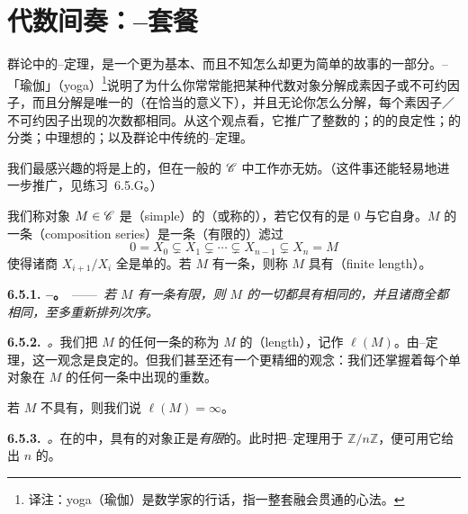 
\section{代数间奏：\trJordan--\trHolder{}套餐}

群论中的\trJordan--\trHolder{}定理，是一个更为基本、而且不知怎么却更为简单的故事的一部分。\trJordan--\trHolder{}「瑜伽」（yoga）\footnote{译注：yoga（瑜伽）是数学家的行话，指一整套融会贯通的心法。}说明了为什么你常常能把某种代数对象分解成素因子或不可约因子，而且分解是唯一的（在恰当的意义下），并且无论你怎么分解，每个素因子／不可约因子出现的次数都相同。从这个观点看，它推广了整数的\trFactorial；\trVectorSpace{}的\trDimension{}的良定性；\trFinitelyGenerated\trAbelianGroups{}的分类；\trDedekind\trIntegralDomain{}中理想的\trFactorial；以及群论中传统的\trJordan--\trHolder{}定理。

我们最感兴趣的将是\trRing{}上的\trModule，但在一般的\trAbelianCategory{} $\mathscr{C}$ 中工作亦无妨。（这件事还能轻易地进一步推广，见练习~6.5.G。）

我们称对象 $M\in\mathscr{C}$ 是\textbf{\trSimple}（simple）的（或称\textbf{\trIrreducible}的），若它仅有的\trSubobject{}是 $0$ 与它自身。$M$ 的一条\textbf{\trCompositionSeries{}}（composition series）是一条（有限的）滤过
\begin{equation*}\tag{6.5.0.1}\label{eq:composition-series-filtration}
0=X_0\subsetneq X_1\subsetneq\cdots\subsetneq X_{n-1}\subsetneq X_n=M
\end{equation*}
使得诸商 $X_{i+1}/X_i$ 全是单的。若 $M$ 有一条\trCompositionSeries{}，则称 $M$ 具有\textbf{\trFiniteLength{}}（finite length）。

\textbf{6.5.1. \trJordan--\trHolder{}\trhTheorem。}\ ——\ \emph{若 $M$ 有一条有限\trCompositionSeries{}，则 $M$ 的一切\trCompositionSeries{}都具有相同的\trLength{}，并且诸商全都相同，至多重新排列次序。}

\textbf{6.5.2.}\ \emph{\trhDefinition{}。}\quad 我们把 $M$ 的任何一条\trCompositionSeries{}的\trLength{}称为 $M$ 的\textbf{\trLength{}}（length），记作 $\ell(M)$。由\trJordan--\trHolder{}定理，这一观念是良定的。但我们甚至还有一个更精细的观念：我们还掌握着每个单对象在 $M$ 的任何一条\trCompositionSeries{}中出现的重数。

若 $M$ 不具有\trFiniteLength{}，则我们说 $\ell(M)=\infty$。

\textbf{6.5.3.}\ \emph{\trhExample{}。}\quad 在\trAbelianGroups{}的\trCategory{}中，具有\trFiniteLength{}的对象正是\emph{有限}的\trAbelianGroups。此时把\trJordan--\trHolder{}定理用于 $\mathbb{Z}/n\mathbb{Z}$，便可用它给出 $n$ 的\trFactorial。


